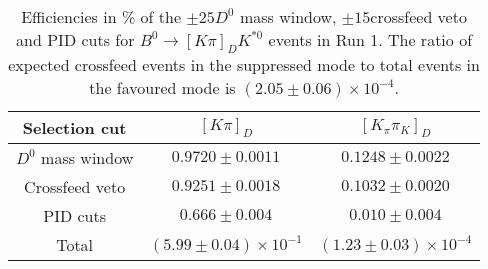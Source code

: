 \begin{table}
    \centering
    \begin{tabular}{ccc}
        \toprule
Selection cut & $[K \pi]_D$ & $[K_\pi \pi_K]_D$ \\
        \midrule
$D^0$ mass window & $0.9720 \pm 0.0011$ & $0.1248 \pm 0.0022$ \\
Crossfeed veto & $0.9251 \pm 0.0018$ & $0.1032 \pm 0.0020$ \\
PID cuts & $0.666 \pm 0.004$ & $0.010 \pm 0.004$\\
        \midrule
Total & $(5.99 \pm 0.04) \times 10^{-1}$ & $(1.23 \pm 0.03) \times 10^{-4}$\\
        \bottomrule
    \end{tabular}
    \caption{Efficiencies in \% of the $\pm 25$\mev $D^0$ mass window, $\pm 15$\mev crossfeed veto and PID cuts for $B^0 \to [K\pi]_D K^{*0}$ events in Run 1. The ratio of expected crossfeed events in the suppressed mode to total events in the favoured mode is $(2.05 \pm 0.06) \times 10^{-4}$.}
\label{tab:double_misID_eff_Kpi_run1}
\end{table}
